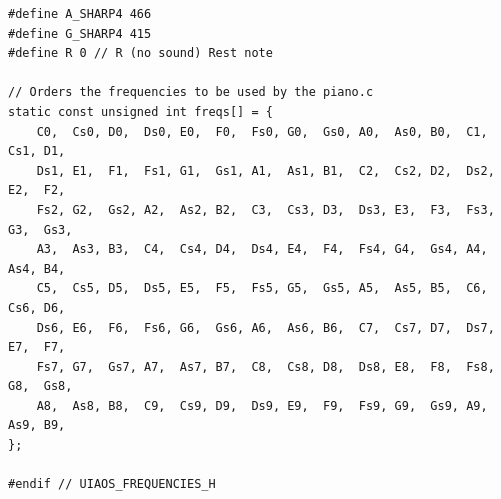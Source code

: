 \documentclass[../main.tex]{subfiles}
\begin{document}
\begin{verbatim}
#define A_SHARP4 466
#define G_SHARP4 415
#define R 0 // R (no sound) Rest note

// Orders the frequencies to be used by the piano.c
static const unsigned int freqs[] = {
    C0,  Cs0, D0,  Ds0, E0,  F0,  Fs0, G0,  Gs0, A0,  As0, B0,  C1,  Cs1, D1,
    Ds1, E1,  F1,  Fs1, G1,  Gs1, A1,  As1, B1,  C2,  Cs2, D2,  Ds2, E2,  F2,
    Fs2, G2,  Gs2, A2,  As2, B2,  C3,  Cs3, D3,  Ds3, E3,  F3,  Fs3, G3,  Gs3,
    A3,  As3, B3,  C4,  Cs4, D4,  Ds4, E4,  F4,  Fs4, G4,  Gs4, A4,  As4, B4,
    C5,  Cs5, D5,  Ds5, E5,  F5,  Fs5, G5,  Gs5, A5,  As5, B5,  C6,  Cs6, D6,
    Ds6, E6,  F6,  Fs6, G6,  Gs6, A6,  As6, B6,  C7,  Cs7, D7,  Ds7, E7,  F7,
    Fs7, G7,  Gs7, A7,  As7, B7,  C8,  Cs8, D8,  Ds8, E8,  F8,  Fs8, G8,  Gs8,
    A8,  As8, B8,  C9,  Cs9, D9,  Ds9, E9,  F9,  Fs9, G9,  Gs9, A9,  As9, B9,
};

#endif // UIAOS_FREQUENCIES_H

\end{verbatim}
\end{document}
